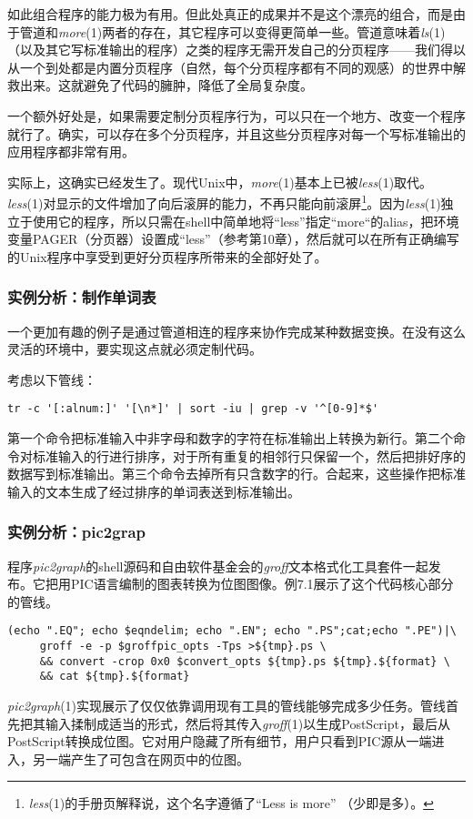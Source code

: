 \documentclass[12pt,oneside]{book}
\begin{document}
\begin{common-format}
如此组合程序的能力极为有用。但此处真正的成果并不是这个漂亮的组合，而是由于管道和\textit{more}(1)两者的存在，其它程序可以变得更简单一些。管道意味着\textit{ls}(1)（以及其它写标准输出的程序）之类的程序无需开发自己的分页程序——我们得以从一个到处都是内置分页程序（自然，每个分页程序都有不同的观感）的世界中解救出来。这就避免了代码的臃肿，降低了全局复杂度。

一个额外好处是，如果需要定制分页程序行为，可以只在一个地方、改变一个程序就行了。确实，可以存在多个分页程序，并且这些分页程序对每一个写标准输出的应用程序都非常有用。

实际上，这确实已经发生了。现代Unix中，\textit{more}(1)基本上已被\textit{less}(1)取代。\textit{less}(1)对显示的文件增加了向后滚屏的能力，不再只能向前滚屏\footnote{\textit{less}(1)的手册页解释说，这个名字遵循了“Less is more”  （少即是多）。}。因为\textit{less}(1)独立于使用它的程序，所以只需在shell中简单地将“less”指定“more“的alias，把环境变量PAGER（分页器）设置成“less”（参考第10章），然后就可以在所有正确编写的Unix程序中享受到更好分页程序所带来的全部好处了。



\subsubsection{实例分析：制作单词表}
一个更加有趣的例子是通过管道相连的程序来协作完成某种数据变换。在没有这么灵活的环境中，要实现这点就必须定制代码。

考虑以下管线：
\begin{Verbatim}
tr -c '[:alnum:]' '[\n*]' | sort -iu | grep -v '^[0-9]*$'
\end{Verbatim}

第一个命令把标准输入中非字母和数字的字符在标准输出上转换为新行。第二个命令对标准输入的行进行排序，对于所有重复的相邻行只保留一个，然后把排好序的数据写到标准输出。第三个命令去掉所有只含数字的行。合起来，这些操作把标准输入的文本生成了经过排序的单词表送到标准输出。


\subsubsection{实例分析：pic2grap}
程序\textit{pic2graph}的shell源码和自由软件基金会的\textit{groff}文本格式化工具套件一起发布。它把用PIC语言编制的图表转换为位图图像。例7.1展示了这个代码核心部分的管线。

\begin{Verbatim}[label=例7.1 pic2grah管线]
(echo ".EQ"; echo $eqndelim; echo ".EN"; echo ".PS";cat;echo ".PE")|\
     groff -e -p $groffpic_opts -Tps >${tmp}.ps \
     && convert -crop 0x0 $convert_opts ${tmp}.ps ${tmp}.${format} \
     && cat ${tmp}.${format}
\end{Verbatim}
\textit{pic2graph}(1)实现展示了仅仅依靠调用现有工具的管线能够完成多少任务。管线首先把其输入揉制成适当的形式，然后将其传入\textit{groff}(1)以生成PostScript，最后从PostScript转换成位图。它对用户隐藏了所有细节，用户只看到PIC源从一端进入，另一端产生了可包含在网页中的位图。


\end{common-format}
\end{document}

